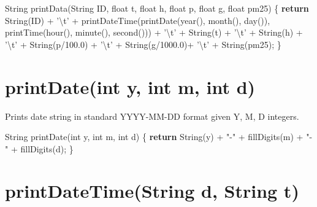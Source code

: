 \documentclass[]{book}
\newenvironment{Shaded}{\begin{snugshade}}{\end{snugshade}}
\newcommand{\CharTok}[1]{\textcolor[rgb]{0.31,0.60,0.02}{#1}}
\newcommand{\ControlFlowTok}[1]{\textcolor[rgb]{0.13,0.29,0.53}{\textbf{#1}}}
\newcommand{\DataTypeTok}[1]{\textcolor[rgb]{0.13,0.29,0.53}{#1}}
\newcommand{\FloatTok}[1]{\textcolor[rgb]{0.00,0.00,0.81}{#1}}
\newcommand{\NormalTok}[1]{#1}
\newcommand{\SpecialCharTok}[1]{\textcolor[rgb]{0.00,0.00,0.00}{#1}}
\newcommand{\StringTok}[1]{\textcolor[rgb]{0.31,0.60,0.02}{#1}}
\begin{document}
\begin{Shaded}
\begin{Highlighting}[]
\NormalTok{String printData(String ID, }\DataTypeTok{float}\NormalTok{ t, }\DataTypeTok{float}\NormalTok{ h, }\DataTypeTok{float}\NormalTok{ p, }\DataTypeTok{float}\NormalTok{ g, }\DataTypeTok{float}\NormalTok{ pm25) \{}
  \ControlFlowTok{return}\NormalTok{ String(ID) + }\CharTok{'}\SpecialCharTok{\textbackslash{}t}\CharTok{'}\NormalTok{ + printDateTime(printDate(year(), month(), day()), printTime(hour(), minute(), second())) + }\CharTok{'}\SpecialCharTok{\textbackslash{}t}\CharTok{'}\NormalTok{ + String(t) + }\CharTok{'}\SpecialCharTok{\textbackslash{}t}\CharTok{'}\NormalTok{ + String(h) + }\CharTok{'}\SpecialCharTok{\textbackslash{}t}\CharTok{'}\NormalTok{ + String(p/}\FloatTok{100.0}\NormalTok{) + }\CharTok{'}\SpecialCharTok{\textbackslash{}t}\CharTok{'}\NormalTok{ + String(g/}\FloatTok{1000.0}\NormalTok{)+ }\CharTok{'}\SpecialCharTok{\textbackslash{}t}\CharTok{'}\NormalTok{ + String(pm25);}
\NormalTok{\}}
\end{Highlighting}
\end{Shaded}

\hypertarget{printdateint-y-int-m-int-d}{%
\section*{printDate(int y, int m, int d)}\label{printdateint-y-int-m-int-d}}

Prints date string in standard YYYY-MM-DD format given Y, M, D integers.

\begin{Shaded}
\begin{Highlighting}[]
\NormalTok{String printDate(}\DataTypeTok{int}\NormalTok{ y, }\DataTypeTok{int}\NormalTok{ m, }\DataTypeTok{int}\NormalTok{ d) \{}
  \ControlFlowTok{return}\NormalTok{ String(y) + }\StringTok{"-"}\NormalTok{ + fillDigits(m) + }\StringTok{"-"}\NormalTok{ + fillDigits(d);}
\NormalTok{\}}
\end{Highlighting}
\end{Shaded}

\hypertarget{printdatetimestring-d-string-t}{%
\section*{printDateTime(String d, String t)}\label{printdatetimestring-d-string-t}}
\end{document}
